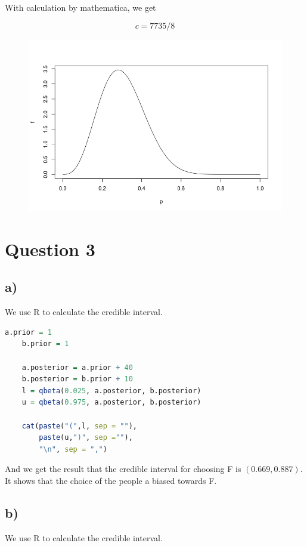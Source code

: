 \documentclass[12pt]{article}
\begin{document}
\begin{flushleft}
\qquad With calculation by mathematica, we get

$$
c = 7735 / 8
$$

\begin{figure}[h]
\centering
\includegraphics[width = 0.7\linewidth]{Ex2.png}
\end{figure}

\newpage

\section{Question 3}

\subsection*{a)}

\qquad We use R to calculate the credible interval.

\begin{lstlisting}[language=R]
    a.prior = 1
    b.prior = 1

    a.posterior = a.prior + 40
    b.posterior = b.prior + 10
    l = qbeta(0.025, a.posterior, b.posterior) 
    u = qbeta(0.975, a.posterior, b.posterior)

    cat(paste("(",l, sep = ""), 
        paste(u,")", sep =""), 
        "\n", sep = ",")

\end{lstlisting} 

\qquad And we get the result that the credible interval for choosing F is $(0.669, 0.887)$. It shows that the choice of the people a biased towards F.

\subsection*{b)}


\qquad We use R to calculate the credible interval.


\end{flushleft}
\end{document}
